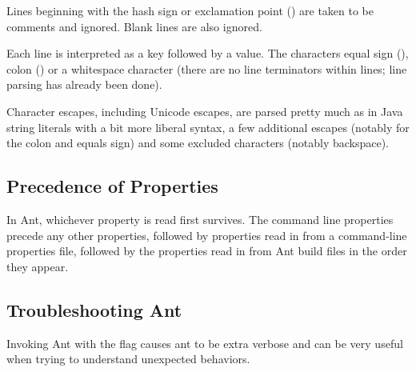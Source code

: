 Lines beginning with the hash sign \code{\#} or exclamation point
(\code{!}) are taken to be comments and ignored.  Blank lines are also
ignored.

Each line is interpreted as a key followed by a value.  The characters
equal sign (\code{=}), colon (\code{:}) or a whitespace character
(there are no line terminators within lines; line parsing has already
been done).

Character escapes, including Unicode escapes, are parsed pretty much
as in Java string literals with a bit
more liberal syntax, a few additional escapes (notably for the colon
and equals sign) and some excluded characters (notably backspace).


\subsection{Precedence of Properties}

In Ant, whichever property is read first survives.  The command
line properties precede any other properties, followed by properties
read in from a command-line properties file, followed by the
properties read in from Ant build files in the order they appear.

\subsection{Troubleshooting Ant}

Invoking Ant with the  flag causes ant to be extra verbose and can be
very useful when trying to understand unexpected behaviors.



